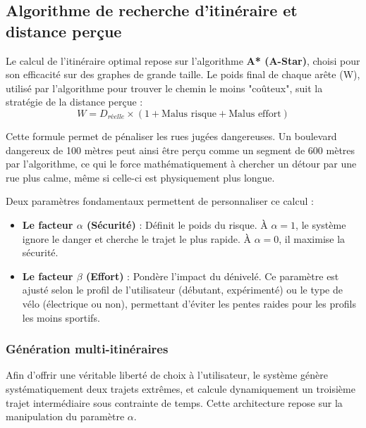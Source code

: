 \subsection{Algorithme de recherche d'itinéraire et distance perçue}

Le calcul de l'itinéraire optimal repose sur l'algorithme \textbf{A* (A-Star)}, choisi pour son efficacité sur des graphes de grande taille. Le poids final de chaque arête (W), utilisé par l'algorithme pour trouver le chemin le moins "coûteux", suit la stratégie de la distance perçue :
\begin{equation}
W = D_{réelle} \times (1 + \text{Malus risque} + \text{Malus effort})
\end{equation}

Cette formule permet de pénaliser les rues jugées dangereuses. Un boulevard dangereux de 100 mètres peut ainsi être perçu comme un segment de 600 mètres par l'algorithme, ce qui le force mathématiquement à chercher un détour par une rue plus calme, même si celle-ci est physiquement plus longue.

Deux paramètres fondamentaux permettent de personnaliser ce calcul :
\begin{itemize}
\item \textbf{Le facteur $\alpha$ (Sécurité)} : Définit le poids du risque. À $\alpha=1$, le système ignore le danger et cherche le trajet le plus rapide. À $\alpha=0$, il maximise la sécurité.
\item \textbf{Le facteur $\beta$ (Effort)} : Pondère l'impact du dénivelé. Ce paramètre est ajusté selon le profil de l'utilisateur (débutant, expérimenté) ou le type de vélo (électrique ou non), permettant d'éviter les pentes raides pour les profils les moins sportifs.
\end{itemize}

\subsubsection{Génération multi-itinéraires}

Afin d'offrir une véritable liberté de choix à l'utilisateur, le système génère systématiquement deux trajets extrêmes, et calcule dynamiquement un troisième trajet intermédiaire sous contrainte de temps. 
Cette architecture repose sur la manipulation du paramètre $\alpha$.

